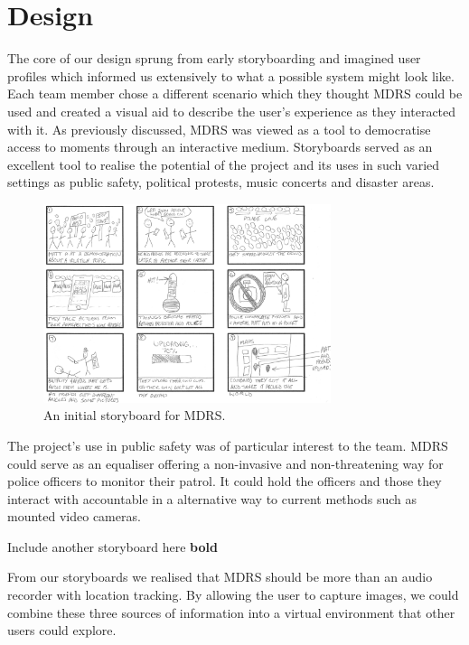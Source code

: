 \documentclass{l3proj}
\begin{document}
\chapter{Design}
\label{design}

The core of our design sprung from early storyboarding and imagined user
profiles which informed us extensively to what a possible system might look
like. Each team member chose a different scenario which they thought MDRS could be used and created a visual aid to describe the user's experience as they interacted with it. As previously discussed, MDRS was viewed as a tool to democratise access to moments through an interactive medium. Storyboards served as an excellent tool to realise the potential of the project and its uses in such varied settings as public safety, political protests, music concerts and disaster areas.

\begin{figure}[ht!]
  \centering
\includegraphics[width=0.75\textwidth]{images/ally-storyboard.jpg}
\caption{An initial storyboard for MDRS.}
\end{figure}

The project's use in public safety was of particular interest to the team. MDRS could serve as an equaliser offering a non-invasive and non-threatening way for police officers to monitor their patrol. It could hold the officers and those they interact with accountable in a alternative way to current methods such as mounted video cameras.

Include another storyboard here {\bf bold}

From our storyboards we realised that MDRS should be more than an audio recorder with location tracking. By allowing the user to capture images, we could combine these three sources of information into a virtual environment that other users could explore.
\end{document}
